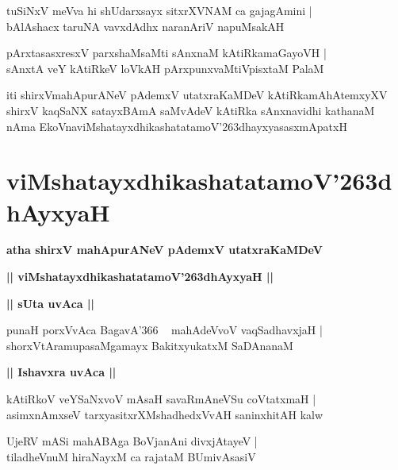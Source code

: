 \documentclass[twoside,12pt,openright]{book}
\def\S{\char'263}
\newcounter{shloka}[chapter]
\def\uvaca#1{\centerline{{\large\textbf{#1}}}}
\begin{document}
\begin{shloka}%
tuSiNxV meVva hi shUdarxsayx sitxrXVNAM ca gajagAmini |\\
bAlAshacx taruNA vavxdAdhx naranAriV napuMsakAH 
\end{shloka}

\begin{shloka}%
pArxtasasxresxV parxshaMsaMti sAnxnaM kAtiRkamaGayoVH |\\
sAnxtA veY kAtiRkeV loVkAH pArxpunxvaMtiVpisxtaM PalaM
\end{shloka}

\begin{center}
iti shirxVmahApurANeV pAdemxV utatxraKaMDeV kAtiRkamAhAtemxyXV shirxV kaqSaNX satayxBAmA saMvAdeV 
kAtiRka sAnxnavidhi kathanaM nAma EkoVnaviMshatayxdhikashatatamoV\S dhayxyasasxmApatxH 
\end{center}

\chapter{viMshatayxdhikashatatamoV\S dhAyxyaH}

\begin{center}
{\LARGE\bfseries atha shirxV mahApurANeV pAdemxV utatxraKaMDeV}
\end{center}

\begin{center}
{\LARGE\bfseries || viMshatayxdhikashatatamoV\S dhAyxyaH || }
\end{center}

\uvaca{|| sUta uvAca ||}

\begin{shloka}%
punaH porxVvAca BagavA\char'366 ~ mahAdeVvoV vaqSadhavxjaH |\\
shorxVtAramupasaMgamayx BakitxyukatxM SaDAnanaM 
\end{shloka}

\uvaca{|| Ishavxra uvAca ||}

\begin{shloka}%
kAtiRkoV veYSaNxvoV mAsaH savaRmAneVSu coVtatxmaH |\\
asimxnAmxseV tarxyasitxrXMshadhedxVvAH saninxhitAH kalw
\end{shloka}

\begin{shloka}%
UjeRV mASi mahABAga BoVjanAni divxjAtayeV |\\
tiladheVnuM hiraNayxM ca rajataM BUmivAsasiV 
\end{shloka}
\end{document}
